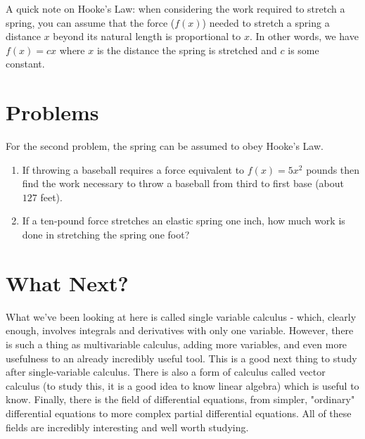 A quick note on Hooke's Law: when considering the work required to stretch a spring, you can assume that the force ($f(x)$) needed to stretch a spring a distance $x$ beyond its natural length is proportional to $x$. 
In other words, we have $f(x) = cx$ where $x$ is the distance the spring is stretched and $c$ is some constant.

\section{Problems}
For the second problem, the spring can be assumed to obey Hooke's Law.

\begin{enumerate}
    \item If throwing a baseball requires a force equivalent to $f(x) = 5x^2$ pounds then find the work necessary to throw a baseball from third to first base (about $127$ feet).
    \item If a ten-pound force stretches an elastic spring one inch, how much work is done in stretching the spring one foot?
\end{enumerate}

\section{What Next?}

What we've been looking at here is called single variable calculus - which, clearly enough, involves integrals and derivatives with only one variable. 
However, there is such a thing as multivariable calculus, adding more variables, and even more usefulness to an already incredibly useful tool. 
This is a good next thing to study after single-variable calculus. 
There is also a form of calculus called vector calculus (to study this, it is a good idea to know
linear algebra) which is useful to know. 
Finally, there is the field of differential equations, from simpler, "ordinary" differential equations to more complex partial differential equations. 
All of these fields are incredibly interesting and well worth studying.

